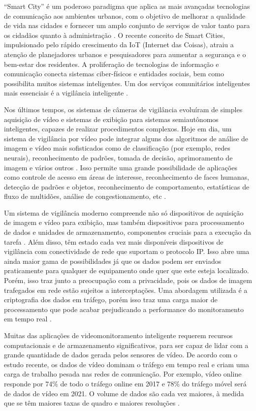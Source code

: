 “Smart City” é um poderoso paradigma que aplica as mais avançadas tecnologias de comunicação aos ambientes urbanos, com o objetivo de melhorar a qualidade de vida nas cidades e fornecer um amplo conjunto de serviços de valor tanto para os cidadãos quanto à administração \cite{Cenedese2014}. O recente conceito de Smart Cities, impulsionado pelo rápido crescimento da IoT (Internet das Coisas), atraiu a atenção de planejadores urbanos e pesquisadores para aumentar a segurança e o bem-estar dos residentes. A proliferação de tecnologias de informação e comunicação conecta sistemas ciber-físicos e entidades sociais, bem como possibilita muitos sistemas inteligentes. Um dos serviços comunitários inteligentes mais essenciais é a vigilância inteligente \cite{Chen2016, Nikouei2018}.

Nos últimos tempos, os sistemas de câmeras de vigilância evoluíram de simples aquisição de vídeo e sistemas de exibição para sistemas semiautônomos inteligentes, capazes de realizar procedimentos complexos. Hoje em dia, um sistema de vigilância por vídeo pode integrar alguns dos algoritmos de análise de imagem e vídeo mais sofisticados como de classificação (por exemplo, redes neurais), reconhecimento de padrões, tomada de decisão, aprimoramento de imagem e vários outros \cite{Tsakanikas2018}. Isso permite uma grande possibilidade de aplicações como controle de acesso em áreas de interesse, reconhecimento de faces humanas, detecção de padrões e objetos, reconhecimento de comportamento, estatísticas de fluxo de multidões, análise de congestionamento, etc \cite{Hu2004}.

Um sistema de vigilância moderno compreende não só dispositivos de aquisição de imagem e vídeo para exibição, mas também dispositivos para processamento de dados e unidades de armazenamento, componentes cruciais para a execução da tarefa \cite{Tsakanikas2018}. Além disso, têm estado cada vez mais disponíveis dispositivos de vigilância com conectividade de rede que suportam o protocolo IP. Isso abre uma ainda maior gama de possibilidades já que os dados podem ser enviados praticamente para qualquer de equipamento onde quer que este esteja localizado. Porém, isso traz junto a preocupação com a privacidade, pois os dados de imagem trafegados em rede estão sujeitos a interceptações. Uma abordagem utilizada é a criptografia dos dados em tráfego, porém isso traz uma carga maior de processamento que pode acabar prejudicando a performance do monitoramento em tempo real \cite{Puvvadi2015}. 

Muitas das aplicações de videomonitoramento inteligente requerem recursos computacionais e de armazenamento significativos, para ser capaz de lidar com a grande quantidade de dados gerada pelos sensores de vídeo. De acordo com o estudo recente, os dados de vídeo dominam o tráfego em tempo real e criam uma carga de trabalho pesada nas redes de comunicação. Por exemplo, vídeo online responde por 74\% de todo o tráfego online em 2017 e 78\% do tráfego móvel será de dados de vídeo em 2021. O volume de dados são cada vez maiores, à medida que se têm maiores taxas de quadro e maiores resoluções \cite{Porter2010}.

